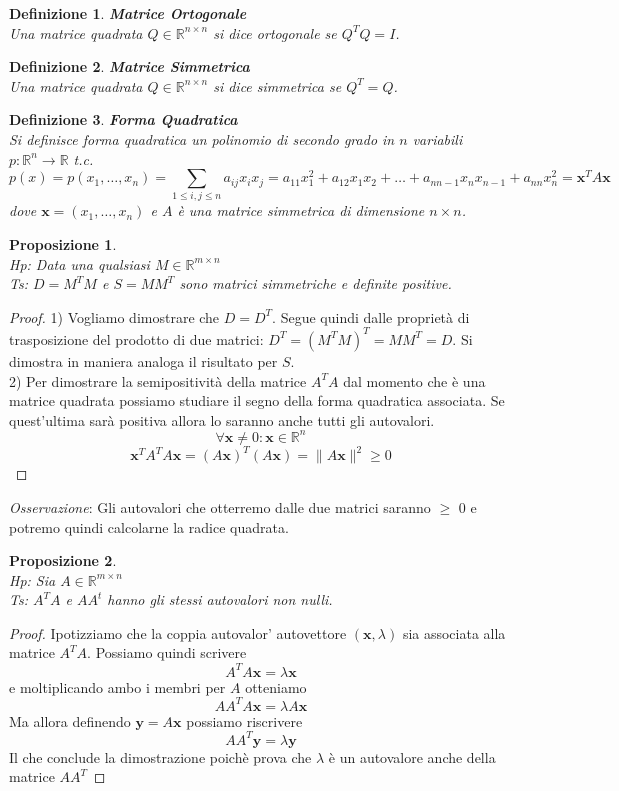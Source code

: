 \documentclass[11pt]{article}
\newtheorem{proposition}{Proposizione}
\newtheorem{definition}{Definizione}
\newcommand{\R}{\mathbb R}
\begin{document}
\begin{definition}
    \textbf{Matrice Ortogonale}\\ Una matrice quadrata $Q\in\mathbb{R}^{n \times n}$ si dice ortogonale se $Q^TQ=I$.
\end{definition}
\begin{definition}
    \textbf{Matrice Simmetrica}\\ Una matrice quadrata $Q\in\mathbb{R}^{n \times n}$ si dice simmetrica se $Q^T=Q$.
\end{definition}
\begin{definition}
    \textbf{Forma Quadratica}\\ Si definisce forma quadratica un polinomio di secondo grado in $n$ variabili $p: \mathbb{R}^n \rightarrow \mathbb{R}$ t.c.
    \[
    p(x)=p(x_1,\dots,x_n)=\sum_{1 \leq i,j \leq n}a_{ij}x_ix_j=a_{11}x_1^2+a_{12}x_1x_2 + \dots + a_{nn-1}x_nx_{n-1}+a_{nn}x_n^2=\mathbf{x}^TA\mathbf{x}
    \]
    dove $\mathbf{x} = (x_1, \dots, x_n)$ e $A$ è una matrice simmetrica di dimensione $n \times n$.
\end{definition}

\begin{proposition}\label{prop 1}
\textbf{}\\
\textit{Hp:} Data una qualsiasi $M\in\mathbb{R}^{m \times n}$\\
\textit{Ts:} $D=M^TM$ e $S=MM^T$ sono  matrici simmetriche e definite positive.
\end{proposition}
\begin{proof}
1) Vogliamo dimostrare che $D=D^T$. Segue quindi dalle proprietà di trasposizione del prodotto di due matrici: $D^T=(M^TM)^T=MM^T=D$. Si dimostra in maniera analoga il risultato per $S$.\\
2) Per dimostrare la semipositività della matrice $A^TA$ dal momento che è una matrice quadrata possiamo studiare il segno della forma quadratica associata. Se quest'ultima sarà positiva allora lo saranno anche tutti gli autovalori.\\
$$ \forall \mathbf{x}\neq 0: \mathbf{x} \in \R^n$$ $$\mathbf{x}^TA^TA\mathbf{x}=(A\mathbf{x})^T(A\mathbf{x})= \|A\mathbf{x}\|^2\geq 0$$
\end{proof}
\noindent
\textit{Osservazione}: Gli autovalori che otterremo dalle due matrici saranno $\geq$ 0 e potremo quindi calcolarne la radice quadrata.
\begin{proposition}\label{prop 2}
\textbf{}\\
\textit{Hp:} Sia $A \in \R^{m \times n}$\\
\textit{Ts:} $A^TA$ e $AA^t$ hanno gli stessi autovalori non nulli.
\end{proposition}
\begin{proof}
Ipotizziamo che la coppia autovalor' autovettore $(\mathbf{x},\lambda)$ sia associata alla matrice $A^TA$. Possiamo quindi scrivere $$A^TA\mathbf{x}=\lambda\mathbf{x}$$ e moltiplicando ambo i membri per $A$ otteniamo$$AA^TA\mathbf{x}=\lambda A\mathbf{x}$$
Ma allora definendo $\mathbf{y}=A\mathbf{x}$ possiamo riscrivere $$AA^T\mathbf{y}=\lambda \mathbf{y}$$
Il che conclude la dimostrazione poichè prova che  $\lambda$ è un autovalore anche della matrice $AA^T$
\end{proof}
\end{document}

